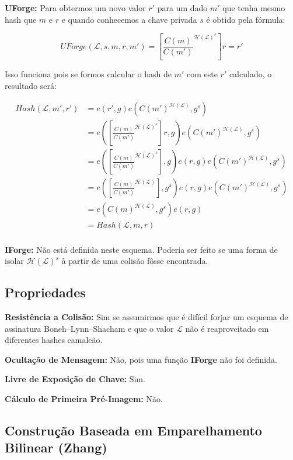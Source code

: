 \documentclass[a4paper]{article}
\begin{document}
\textbf{UForge:} Para obtermos um novo valor $r'$ para um dado $m'$
que tenha mesmo hash que $m$ e $r$ e quando conhecemos a chave privada
$s$ é obtido pela fórmula:

$$
UForge(\mathcal{L}, s, m, r, m') = \left[\frac{C(m)}{C(m')}^{\mathcal{H}(\mathcal{L})^s}\right]r = r'
$$

Isso funciona pois se formos calcular o hash de $m'$ com este $r'$
calculado, o resultado será:

\begin{equation}
\begin{split}
  Hash(\mathcal{L}, m', r') &= e(r', g)e(C(m')^{\mathcal{H}(\mathcal{L})}, g^s)\\
  &= e(\left[\frac{C(m)}{C(m')}^{\mathcal{H}(\mathcal{L})^s}\right]r, g)e(C(m')^{\mathcal{H}(\mathcal{L})}, g^s)\\
  &=e(\left[\frac{C(m)}{C(m')}^{\mathcal{H}(\mathcal{L})^s}\right], g)e(r, g)e(C(m')^{\mathcal{H}(\mathcal{L})}, g^s)\\
  &=e(\left[\frac{C(m)}{C(m')}^{\mathcal{H}(\mathcal{L})}\right], g^s)e(r, g)e(C(m')^{\mathcal{H}(\mathcal{L})}, g^s)\\
  &=e(C(m)^{\mathcal{H}(\mathcal{L})}, g^s)e(r, g)\\
  &= Hash(\mathcal{L}, m, r)\\
\end{split}
\end{equation}

\textbf{IForge:} Não está definida neste esquema. Poderia ser feito se
uma forma de isolar $\mathcal{H}(\mathcal{L})^s$ à partir de uma
colisão fôsse encontrada.

\subsection{Propriedades}

\textbf{Resistência a Colisão: }Sim se assumirmos que é difícil forjar
um esquema de assinatura Boneh–Lynn–Shacham e que o valor
$\mathcal{L}$ não é reaproveitado em diferentes hashes camaleão.

\textbf{Ocultação de Mensagem: }Não, pois uma função \textbf{IForge}
não foi definida.

\textbf{Livre de Exposição de Chave: } Sim.

\textbf{Cálculo de Primeira Pré-Imagem: }Não.

\subsection{Construção Baseada em Emparelhamento Bilinear (Zhang) \cite{zhang}}
\end{document}
